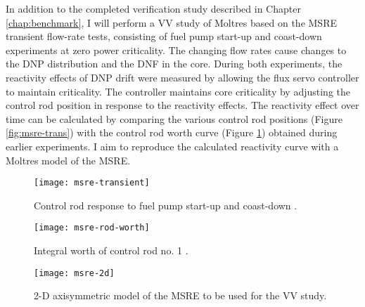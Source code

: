In addition to the completed verification study described in Chapter \ref{chap:benchmark}, I will
perform a \gls{VV} study of Moltres based on the \gls{MSRE} transient flow-rate tests,
consisting of fuel pump start-up and coast-down experiments at zero power criticality. The changing
flow rates cause changes to the \gls{DNP} distribution and the \gls{DNF} in the core. During both
experiments, the reactivity effects of \gls{DNP} drift were measured by
allowing the flux servo controller to maintain criticality. The controller maintains core
criticality by adjusting the control rod position in response to the reactivity effects. The
reactivity effect over time can be calculated by comparing the various control rod positions
(Figure \ref{fig:msre-trans}) with the control rod worth curve (Figure \ref{fig:msre-rod})
obtained during earlier experiments. I aim to
reproduce the calculated reactivity curve with a Moltres model of the \gls{MSRE}.

\begin{figure}[htb!]
  \centering
  \begin{minipage}[t]{.49\textwidth}
    \centering
    \texttt{[image: msre-transient]}
    \caption{Control rod response to fuel pump start-up and coast-down
    \cite{prince_zero-power_1968}.}
    \label{fig:msre-trans}
  \end{minipage}
  \hfill
  \begin{minipage}[t]{.49\textwidth}
    \centering
    \texttt{[image: msre-rod-worth]}
    \caption{Integral worth of control rod no. 1 \cite{prince_zero-power_1968}.}
    \label{fig:msre-rod}
  \end{minipage}
\end{figure}
%
\begin{figure}[htb!]
  \centering
  \texttt{[image: msre-2d]}
  \caption{2-D axisymmetric model of the \gls{MSRE} to be used for the \gls{VV} study.}
  \label{fig:msre-2d}
\end{figure}

